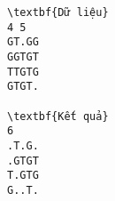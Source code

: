 \begin{verbatim}
\textbf{Dữ liệu}
4 5
GT.GG
GGTGT
TTGTG
GTGT.	

\textbf{Kết quả}
6
.T.G.
.GTGT
T.GTG
G..T.
\end{verbatim}